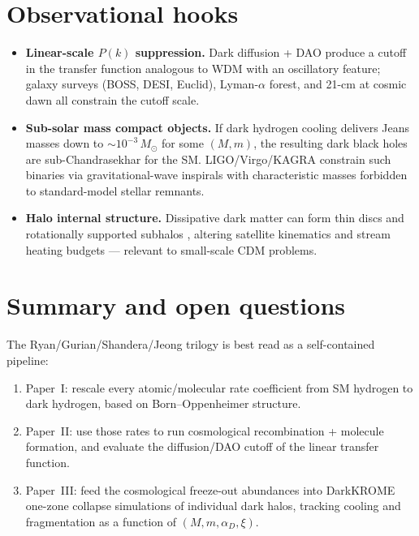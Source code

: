 \documentclass[12pt]{article}
\newcommand{\alphaD}{\alpha_D}
\begin{document}
\section{Observational hooks}
\label{sec:observational}

\begin{itemize}
  \item \textbf{Linear-scale $P(k)$ suppression.}  Dark diffusion +
        DAO produce a cutoff in the transfer function analogous to WDM
        with an oscillatory feature; galaxy surveys (BOSS, DESI, Euclid),
        Lyman-$\alpha$ forest, and 21-cm at cosmic dawn all constrain
        the cutoff scale.
  \item \textbf{Sub-solar mass compact objects.}  If dark hydrogen
        cooling delivers Jeans masses down to $\sim 10^{-3}\,M_\odot$
        for some $(M, m)$, the resulting dark black holes are
        sub-Chandrasekhar for the SM.  LIGO/Virgo/KAGRA constrain such
        binaries via gravitational-wave inspirals with characteristic
        masses forbidden to standard-model stellar remnants.
  \item \textbf{Halo internal structure.}  Dissipative dark matter
        can form thin discs and rotationally supported subhalos
        \citep{Fan2013}, altering satellite kinematics and stream
        heating budgets --- relevant to small-scale CDM problems.
\end{itemize}

\section{Summary and open questions}
\label{sec:summary}

The Ryan/Gurian/Shandera/Jeong trilogy is best read as a self-contained
pipeline:
\begin{enumerate}
  \item Paper~I: rescale every atomic/molecular rate coefficient from
        SM hydrogen to dark hydrogen, based on Born--Oppenheimer
        structure.
  \item Paper~II: use those rates to run cosmological
        recombination + molecule formation, and evaluate the
        diffusion/DAO cutoff of the linear transfer function.
  \item Paper~III: feed the cosmological freeze-out abundances into
        DarkKROME one-zone collapse simulations of individual dark
        halos, tracking cooling and fragmentation as a function of
        $(M, m, \alphaD, \xi)$.
\end{enumerate}
\end{document}
